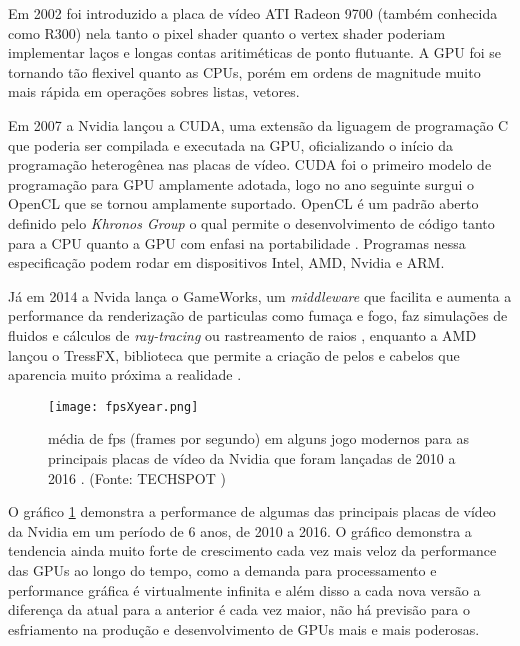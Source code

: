   Em 2002 foi introduzido a placa de vídeo ATI Radeon 9700 (também conhecida como R300)\citep{AMD} nela tanto o pixel shader quanto o vertex shader poderiam implementar laços e longas contas aritiméticas de ponto flutuante. A GPU foi se tornando tão flexivel quanto as CPUs, porém em ordens de magnitude muito mais rápida em operações sobres listas, vetores.

  Em 2007 a Nvidia lançou a CUDA, uma extensão da liguagem de programação C que poderia ser compilada e executada na GPU, oficializando o início da programação heterogênea nas placas de vídeo. CUDA foi o primeiro modelo de programação para GPU amplamente adotada, logo no ano seguinte surgui o OpenCL que se tornou amplamente suportado. OpenCL é um padrão aberto definido pelo \textit{Khronos Group} o qual permite o desenvolvimento de código tanto para a CPU quanto a GPU com enfasi na portabilidade \citep{opencl}. Programas nessa especificação podem rodar em dispositivos Intel, AMD, Nvidia e ARM.


  Já em 2014 a Nvida lança o GameWorks, um \textit{middleware} que facilita e aumenta a performance da renderização de particulas como fumaça e fogo, faz simulações de fluidos e cálculos de \textit{ray-tracing} ou rastreamento de raios \citep{gameworks}, enquanto a AMD lançou o TressFX, biblioteca que permite a criação de pelos e cabelos que aparencia muito próxima a realidade \citep{tressfx}.

  \begin{figure}[!h]
    \centering
    \texttt{[image: fpsXyear.png]}
    \caption{média de fps (frames por segundo) em alguns jogo modernos para as principais placas de vídeo da Nvidia que foram lançadas de 2010 a 2016 . (Fonte: TECHSPOT \protect\footnotemark)}
    \label{fig:fpsXyear}
  \end{figure}


  O gráfico \ref{fig:fpsXyear} demonstra a performance de algumas das principais placas de vídeo da Nvidia em um período de 6 anos, de 2010 a 2016. O gráfico demonstra a tendencia ainda muito forte de crescimento cada vez mais veloz da performance das GPUs ao longo do tempo, como a demanda para processamento e performance gráfica é virtualmente infinita e além disso a cada nova versão a diferença da atual para a anterior é cada vez maior, não há previsão para o esfriamento na produção e desenvolvimento de GPUs mais e mais poderosas.

